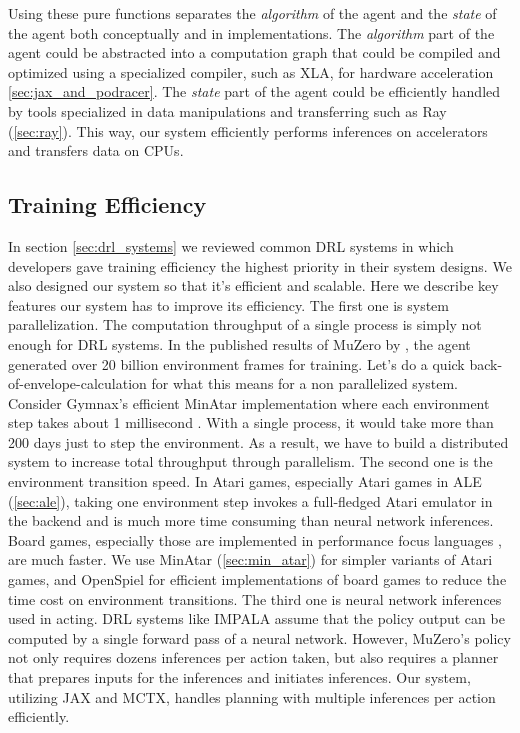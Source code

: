 Using these pure functions separates the \textit{algorithm} of the agent and the \textit{state} of the agent both conceptually and in implementations.
The \textit{algorithm} part of the agent could be abstracted into a computation graph that could be compiled and optimized using a specialized compiler, such as XLA, for hardware acceleration \ref{sec:jax_and_podracer}.
The \textit{state} part of the agent could be efficiently handled by tools specialized in data manipulations and transferring such as Ray (\ref{sec:ray}).
This way, our system efficiently performs inferences on accelerators and transfers data on CPUs.

\subsection{Training Efficiency}
In section \ref{sec:drl_systems} we reviewed common DRL systems in which developers gave training efficiency the highest priority in their system designs.
We also designed our system so that it's efficient and scalable.
Here we describe key features our system has to improve its efficiency.
The first one is system parallelization.
The computation throughput of a single process is simply not enough for DRL systems.
In the published results of MuZero by \cite{MasteringAtariGo_Schrittwieser.Antonoglou.ea_2020}, the agent generated over 20 billion environment frames for training.
Let's do a quick back-of-envelope-calculation for what this means for a non parallelized system.
Consider Gymnax's efficient MinAtar implementation where each environment step takes about 1 millisecond \cite{GymnaxJAXbasedReinforcement_RobertTjarkoLange_2022}.
With a single process, it would take more than 200 days just to step the environment.
As a result, we have to build a distributed system to increase total throughput through parallelism.
The second one is the environment transition speed.
In Atari games, especially Atari games in ALE (\ref{sec:ale}), taking one environment step invokes a full-fledged Atari emulator in the backend and is much more time consuming than neural network inferences.
Board games, especially those are implemented in performance focus languages , are much faster.
We use MinAtar (\ref{sec:min_atar}) for simpler variants of Atari games, and OpenSpiel for efficient implementations of board games to reduce the time cost on environment transitions.
The third one is neural network inferences used in acting.
DRL systems like IMPALA assume that the policy output can be computed by a single forward pass of a neural network.
However, MuZero's policy not only requires dozens inferences per action taken, but also requires a planner that prepares inputs for the inferences and initiates inferences.
Our system, utilizing JAX and MCTX, handles planning with multiple inferences per action efficiently.

